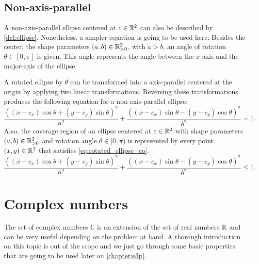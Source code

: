 \subsection{Non-axis-parallel}

A non-axis-parallel ellipse centered at $c\in\mathbb{R}^2$ can also be described by \autoref{def:ellipse}. Nonetheless, a simpler equation is going to be used here. Besides the center, the shape parameters $(a, b) \in \mathbb{R}^2_{>0}$, with $a > b$, an angle of rotation $\theta \in [0, \pi]$ is given. This angle represents the angle between the $x$-axis and the major-axis of the ellipse.

A rotated ellipse by $\theta$ can be transformed into a axis-parallel centered at the origin by applying two linear transformations. Reversing these transformations produces the following equation for a non-axis-parallel ellipse:
\begin{equation}\label{eq:rotated_ellipse}
\dfrac{((x-c_x)\cos\theta + (y-c_y)\sin\theta)^2}{a^2}+\dfrac{((x-c_x)\sin\theta - (y-c_y)\cos\theta)^2}{b^2}=1.
\end{equation}
Also, the coverage region of an ellipse centered at $c\in\mathbb{R}^2$ with shape parameters $(a, b)\in\mathbb{R}^2_{>0}$ and rotation angle $\theta \in [0, \pi)$ is represented by every point $(x, y) \in \mathbb{R}^2$ that satisfies \autoref{eq:rotated_ellipse_co}.
\begin{equation}\label{eq:rotated_ellipse_co}
\dfrac{((x-c_x)\cos\theta + (y-c_y)\sin\theta)^2}{a^2}+\dfrac{((x-c_x)\sin\theta - (y-c_y)\cos\theta)^2}{b^2}\le 1.
\end{equation}

\section{Complex numbers}

The set of complex numbers $\mathbb{C}$ is an extension of the set of real numbers $\mathbb{R}$ and can be very useful depending on the problem at hand. A thorough introduction on this topic is out of the scope and we just go through some basic properties that are going to be used later on \autoref{chapter:e3p}.

